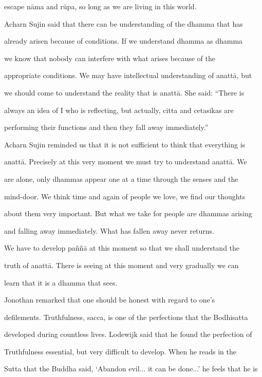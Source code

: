 escape nāma and rūpa, so long as we are living in this world. 

   Acharn  Sujin said that there can be understanding of the dhamma that has  

already  arisen because  of  conditions.  If we understand  dhamma  as  dhamma  

we   know   that   nobody   can   interfere   with   what   arises   because   of   the  

appropriate conditions. We may have intellectual understanding of anattā, but  

we  should  come to understand the reality that  is  anattā.  She  said:  “There  is  

always  an  idea  of  I  who   is  reflecting,  but   actually,  citta  and  cetasikas  are  

performing their functions and then they fall away immediately.” 

   Acharn Sujin reminded us that it is not sufficient to think that everything is  

anattā. Precisely  at this very  moment we  must try to understand  anattā. We  

are  alone,  only  dhammas  appear  one  at  a  time  through  the  senses  and  the  

mind-door. We think time and again of people we love, we find our thoughts  

about them very important. But what we take for people are dhammas arising  

and falling away immediately. What has fallen away never returns. 

   We have to develop paññā at this moment so that we shall understand the  

truth  of  anattā.  There  is  seeing  at  this  moment  and very  gradually  we  can  

learn that it is a dhamma that sees. 

   Jonothan   remarked   that   one   should   be   honest   with   regard   to   one’s  

defilements. Truthfulness, sacca, is one of the perfections that the Bodhisatta  

developed during countless lives. Lodewijk said that he found the perfection of  

Truthfulness  essential,  but   very   difficult  to  develop.  When  he  reads  in  the  

Sutta that the Buddha said, ‘Abandon evil... it can be done...’ he feels that he is  

